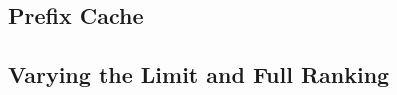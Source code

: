\subsection{Prefix Cache}
\label{sec:exp:cache}



\Needspace{327pt}
\subsection{Varying the Limit and Full Ranking}
\label{sec:exp:limit-sweep}

\endgroup
